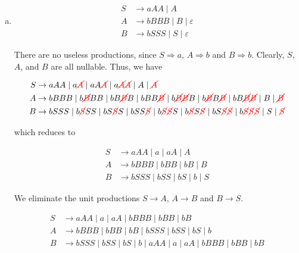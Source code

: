 \begin{solution}
\begin{enumerate}[(a)]
        \item 
        \begin{align*}
            S &\to aAA\mid A\\ 
            A &\to bBBB\mid B\mid \varepsilon \\
            B &\to bSSS\mid S\mid \varepsilon 
        \end{align*}

        There are no useless productions, since \(S\Rightarrow a\), \(A\Rightarrow b\) and \(B\Rightarrow b\). Clearly, \(S\), \(A\), and \(B\) are all nullable. Thus, we have 

        \begin{align*}
            S &\to aAA\mid a{\color{red}\cancel{A}}\mid aA{\color{red}\cancel{A}}\mid a{\color{red}\cancel{A}}{\color{red}\cancel{A}}\mid A\mid {\color{red}\cancel{A}}\\ 
            A &\to bBBB\mid b{\color{red}\cancel{B}}BB\mid bB{\color{red}\cancel{B}}B\mid bBB{\color{red}\cancel{B}}\mid b{\color{red}\cancel{B}}{\color{red}\cancel{B}}B\mid b{\color{red}\cancel{B}}B{\color{red}\cancel{B}}\mid bB{\color{red}\cancel{B}}{\color{red}\cancel{B}}\mid B\mid {\color{red}\cancel{B}}\\
            B &\to bSSS\mid b{\color{red}\cancel{S}}SS\mid bS{\color{red}\cancel{S}}S\mid bSS{\color{red}\cancel{S}}\mid b{\color{red}\cancel{S}}{\color{red}\cancel{S}}S\mid b{\color{red}\cancel{S}}S{\color{red}\cancel{S}}\mid bS{\color{red}\cancel{S}}{\color{red}\cancel{S}}\mid b{\color{red}\cancel{S}}{\color{red}\cancel{S}}{\color{red}\cancel{S}}\mid S\mid {\color{red}\cancel{S}} 
        \end{align*}

        which reduces to

        \begin{align*}
            S &\to aAA\mid a\mid aA\mid A \\ 
            A &\to bBBB\mid bBB\mid bB\mid B \\
            B &\to bSSS\mid bSS\mid bS\mid b\mid S  
        \end{align*}

        We eliminate the unit productions \(S\to A\), \(A\to B\) and \(B\to S\).

        \begin{align*}
            S &\to aAA\mid a\mid aA\mid bBBB\mid bBB\mid bB \\ 
            A &\to bBBB\mid bBB\mid bB\mid bSSS\mid bSS\mid bS\mid b \\
            B &\to bSSS\mid bSS\mid bS\mid b\mid aAA\mid a\mid aA\mid bBBB\mid bBB\mid bB
        \end{align*}


\end{enumerate}
\end{solution}
